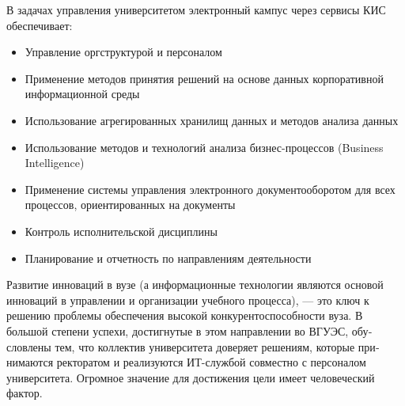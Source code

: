 В задачах управления университетом электронный кампус через сервисы КИС обеспечивает:
 \begin{itemize}
	\item Управление оргструктурой и персоналом
	\item Применение методов принятия решений на основе данных корпоративной информационной среды
	\item Использование агрегированных хранилищ данных и методов анализа данных
	\item Использование методов и технологий анализа бизнес-процессов (Business Intelligence)
	\item Применение системы управления электронного документооборотом для всех процессов, ориентированных на документы
	\item Контроль исполнительской дисциплины
	\item Планирование и отчетность по направлениям деятельности
\end{itemize}
Развитие инноваций в вузе (а информационные технологии являются осно­вой инноваций в управлении и организации учебного процесса), — это ключ к решению проблемы обеспечения высокой конкурентоспособности вуза. В большой степени успехи, достигнутые в этом направлении во ВГУЭС, обу­словлены тем, что коллектив университета доверяет решениям, которые при­нимаются ректоратом и реализуются ИТ-службой совместно с персоналом университета. Огромное значение для достижения цели имеет человеческий фактор.